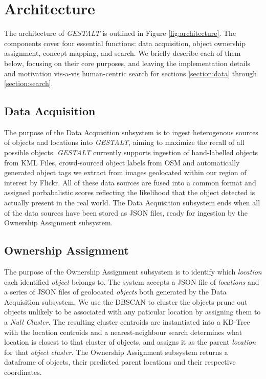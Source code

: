\section{Architecture}
\label{section:architecture}

\begin{figure*}[t]
    
    \centering
    \caption[width=\textwidth]{The architecture of \emph{GESTALT} consists of the data collection subsystem, the ownership assignment process, the concept mapping process and the search subsystem.}
    \label{fig:architecture}
\end{figure*}

The architecture of \textit{GESTALT} is outlined in Figure \ref{fig:architecture}. The components cover four essential functions: data acquisition, object ownership assignment, concept mapping, and search. 
We briefly describe each of them below, focusing on their core purposes, and leaving the implementation details and motivation vis-a-vis human-centric search for sections \ref{section:data} through \ref{section:search}. 

\subsection{Data Acquisition}
The purpose of the Data Acquisition subsystem is to ingest heterogenous sources of objects and locations into \emph{GESTALT}, aiming to maximize the recall of all possible objects. 
\emph{GESTALT} currently supports ingestion of hand-labelled objects from KML Files, crowd-sourced object labels from OSM and automatically generated object tags we extract from images geolocated within our region of interest by Flickr.
All of these data sources are fused into a common format and assigned porbabalistic scores reflecting the likelihood that the object detected is actually present in the real world. 
The Data Acquisition subsystem ends when all of the data sources have been stored as JSON files, ready for ingestion by the Ownership Assignment subsystem. 

\subsection{Ownership Assignment}
The purpose of the Ownership Assignment subsystem is to identify which \textit{location} each identified \textit{object} belongs to. 
The system accepts a JSON file of \textit{locations} and a series of JSON files of geolocated \textit{objects} both generated by the Data Acquisition subsystem. 
We use the DBSCAN  to cluster the objects prune out objects unlikely to be associated with any paticular location by assigning them to a \textit{Null Cluster}. 
The resulting cluster centroids are instantiated into a KD-Tree with the location centroids and a nearest-neighbour search determines what location is closest to that cluster of objects, and assigns it as the parent \textit{location} for that \textit{object cluster}.
The Ownership Assignment subsystem returns a dataframe of objects, their predicted parent locations and their respective coordinates. 

